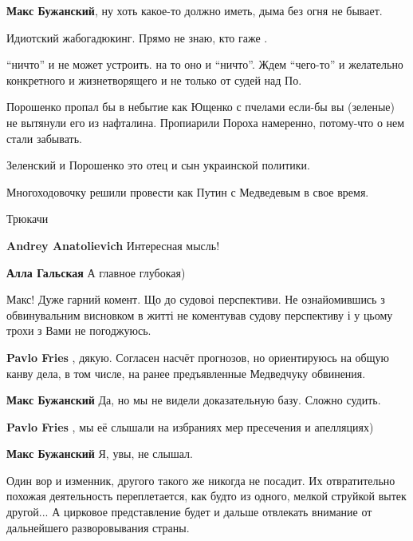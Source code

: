\begin{itemize}
\begin{itemize}
\textbf{Макс Бужанский}, ну хоть какое-то должно иметь, дыма без огня не бывает.
\end{itemize} %

Идиотский жабогадюкинг. Прямо не знаю, кто гаже .

\enquote{ничто} и не может устроить. на то оно и \enquote{ничто}.
Ждем \enquote{чего-то} и желательно конкретного и жизнетворящего и не только от судей над По.


Порошенко пропал бы в небытие как Ющенко с пчелами если-бы вы (зеленые) не
вытянули его из нафталина. Пропиарили Пороха намеренно, потому-что о нем стали
забывать.

Зеленский и Порошенко это отец и сын украинской политики.

Многоходовочку решили провести как Путин с Медведевым в свое время.

Трюкачи

\begin{itemize} %
\textbf{Andrey Anatolievich} Интересная мысль!

\textbf{Алла Гальская} А главное глубокая)
\end{itemize} %


Макс! Дуже гарний комент. Що до судовоі перспективи. Не ознайомившись з
обвинувальним висновком в житті не коментував судову перспективу і у цьому
трохи з Вами не погоджуюсь.

\begin{itemize} %
\textbf{Pavlo Fries} , дякую.
Согласен насчёт прогнозов, но ориентируюсь на общую канву дела, в том числе, на ранее предъявленные Медведчуку обвинения.

\textbf{Макс Бужанский} Да, но мы не видели доказательную базу. Сложно судить.

\textbf{Pavlo Fries} , мы её слышали на избраниях мер пресечения и апелляциях)

\textbf{Макс Бужанский} Я, увы, не слышал.
\end{itemize} %


Один вор и изменник, другого такого же никогда не посадит. Их отвратительно
похожая деятельность переплетается, как будто из одного, мелкой струйкой вытек
другой... А цирковое представление будет и дальше отвлекать внимание от
дальнейшего разворовывания страны.


\end{itemize}
